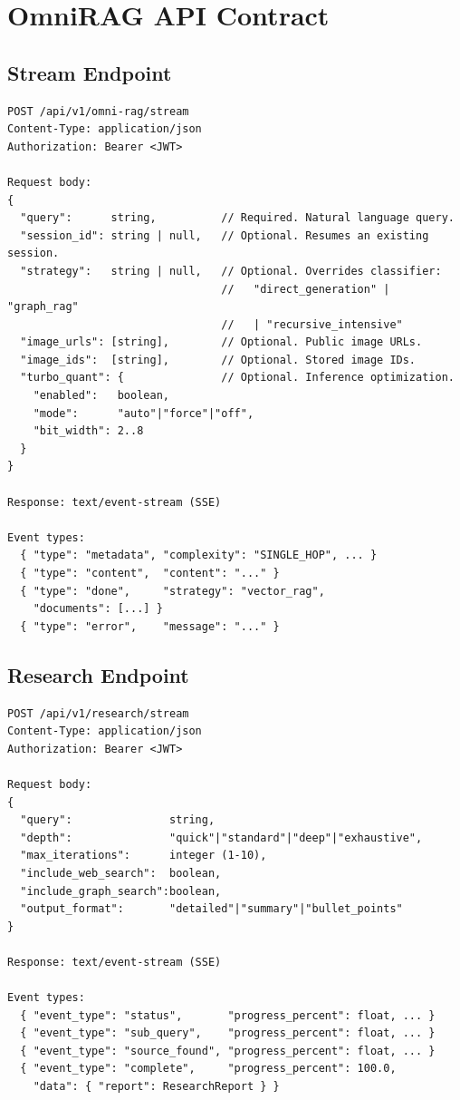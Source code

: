 \section{OmniRAG API Contract}
\label{sec:api-contract}

\subsection{Stream Endpoint}
\label{sec:stream-api}

\begin{verbatim}
POST /api/v1/omni-rag/stream
Content-Type: application/json
Authorization: Bearer <JWT>

Request body:
{
  "query":      string,          // Required. Natural language query.
  "session_id": string | null,   // Optional. Resumes an existing session.
  "strategy":   string | null,   // Optional. Overrides classifier:
                                 //   "direct_generation" | "graph_rag"
                                 //   | "recursive_intensive"
  "image_urls": [string],        // Optional. Public image URLs.
  "image_ids":  [string],        // Optional. Stored image IDs.
  "turbo_quant": {               // Optional. Inference optimization.
    "enabled":   boolean,
    "mode":      "auto"|"force"|"off",
    "bit_width": 2..8
  }
}

Response: text/event-stream (SSE)

Event types:
  { "type": "metadata", "complexity": "SINGLE_HOP", ... }
  { "type": "content",  "content": "..." }
  { "type": "done",     "strategy": "vector_rag",
    "documents": [...] }
  { "type": "error",    "message": "..." }
\end{verbatim}

\subsection{Research Endpoint}
\label{sec:research-api}

\begin{verbatim}
POST /api/v1/research/stream
Content-Type: application/json
Authorization: Bearer <JWT>

Request body:
{
  "query":               string,
  "depth":               "quick"|"standard"|"deep"|"exhaustive",
  "max_iterations":      integer (1-10),
  "include_web_search":  boolean,
  "include_graph_search":boolean,
  "output_format":       "detailed"|"summary"|"bullet_points"
}

Response: text/event-stream (SSE)

Event types:
  { "event_type": "status",       "progress_percent": float, ... }
  { "event_type": "sub_query",    "progress_percent": float, ... }
  { "event_type": "source_found", "progress_percent": float, ... }
  { "event_type": "complete",     "progress_percent": 100.0,
    "data": { "report": ResearchReport } }
\end{verbatim}

